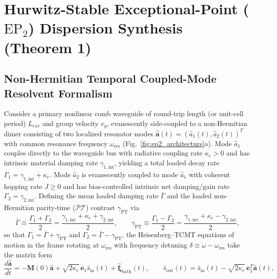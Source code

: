 \documentclass[11pt,letterpaper]{article}
\theoremstyle{definition}
\theoremstyle{remark}
\begin{document}
\section{Hurwitz-Stable Exceptional-Point ($\mathrm{EP}_2$) Dispersion Synthesis (Theorem 1)}
\label{sec:thm1_ep2}

\subsection{Non-Hermitian Temporal Coupled-Mode Resolvent Formalism}

Consider a primary nonlinear comb waveguide of round-trip length (or unit-cell period) $L_{\mathrm{cav}}$ and group velocity $v_g$, evanescently side-coupled to a non-Hermitian dimer consisting of two localized resonator modes $\hat{\mathbf{a}}(t) = (\hat{a}_1(t), \hat{a}_2(t))^T$ with common resonance frequency $\omega_{\mathrm{res}}$ (Fig.~\ref{fig:ep2_architecture}a). Mode $\hat{a}_1$ couples directly to the waveguide bus with radiative coupling rate $\kappa_e > 0$ and has intrinsic material damping rate $\gamma_{1,\mathrm{int}}$, yielding a total loaded decay rate $\Gamma_1 = \gamma_{1,\mathrm{int}} + \kappa_e$. Mode $\hat{a}_2$ is evanescently coupled to mode $\hat{a}_1$ with coherent hopping rate $J \ge 0$ and has bias-controlled intrinsic net damping/gain rate $\Gamma_2 = \gamma_{2,\mathrm{int}}$. Defining the mean loaded damping rate $\bar{\Gamma}$ and the loaded non-Hermitian parity-time ($\mathcal{PT}$) contrast $\gamma_{\mathrm{PT}}$ via
\begin{equation}
\bar{\Gamma} \equiv \frac{\Gamma_1 + \Gamma_2}{2} = \frac{\gamma_{1,\mathrm{int}} + \kappa_e + \gamma_{2,\mathrm{int}}}{2}, \qquad \gamma_{\mathrm{PT}} \equiv \frac{\Gamma_1 - \Gamma_2}{2} = \frac{\gamma_{1,\mathrm{int}} + \kappa_e - \gamma_{2,\mathrm{int}}}{2},
\label{eq:gamma_bar_pt_def}
\end{equation}
so that $\Gamma_1 = \bar{\Gamma} + \gamma_{\mathrm{PT}}$ and $\Gamma_2 = \bar{\Gamma} - \gamma_{\mathrm{PT}}$, the Heisenberg--TCMT equations of motion in the frame rotating at $\omega_{\mathrm{res}}$ with frequency detuning $\delta \equiv \omega - \omega_{\mathrm{res}}$ take the matrix form
\begin{equation}
\frac{d\hat{\mathbf{a}}}{dt} = -\mathbf{M}(0)\hat{\mathbf{a}} + \sqrt{2\kappa_e}\,\mathbf{e}_1 \hat{s}_{\mathrm{in}}(t) + \hat{\mathbf{\xi}}_{\mathrm{bath}}(t), \qquad \hat{s}_{\mathrm{out}}(t) = \hat{s}_{\mathrm{in}}(t) - \sqrt{2\kappa_e}\,\mathbf{e}_1^T \hat{\mathbf{a}}(t),
\label{eq:tcmt_dimer_time}
\end{equation}
\end{document}
